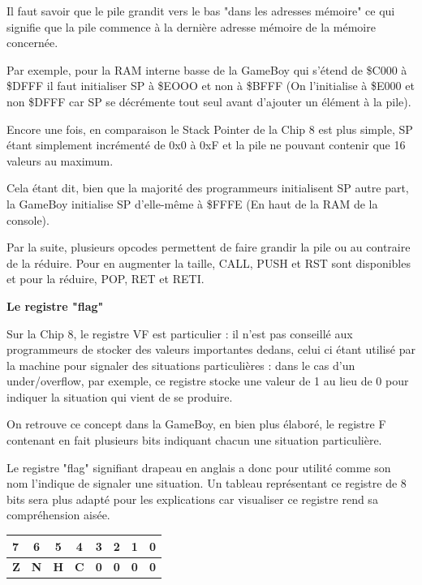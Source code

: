\documentclass[12pt, a4paper]{article}
\begin{document}
Il faut savoir que le pile grandit vers le bas "dans les adresses mémoire" ce qui signifie que la pile commence à la dernière adresse mémoire de la mémoire concernée. 

\bigskip

Par exemple, pour la RAM interne basse de la GameBoy qui s'étend de \$C000 à \$DFFF il faut initialiser SP à \$EOOO et non à \$BFFF (On l'initialise à \$E000 et non \$DFFF car SP se décrémente tout seul avant d'ajouter un élément à la pile). 

Encore une fois, en comparaison le Stack Pointer de la Chip 8 est plus simple, SP étant simplement incrémenté de 0x0 à 0xF et la pile ne pouvant contenir que 16 valeurs au maximum.

\pagebreak
Cela étant dit, bien que la majorité des programmeurs initialisent SP autre part, la GameBoy initialise SP d'elle-même à \$FFFE (En haut de la RAM de la console).

\bigskip

Par la suite, plusieurs opcodes permettent de faire grandir la pile ou au contraire de la réduire. Pour en augmenter la taille, CALL, PUSH et RST sont disponibles et pour la réduire, POP, RET et RETI.

\bigskip


\begin{center}{\bf Le registre "flag"}\end{center}

Sur la Chip 8, le registre VF est particulier : il n'est pas conseillé aux programmeurs de stocker des valeurs importantes dedans, celui ci étant utilisé par la machine pour signaler des situations particulières : dans le cas d'un under/overflow, par exemple, ce registre stocke une valeur de 1 au lieu de 0 pour indiquer la situation qui vient de se produire.

\bigskip
On retrouve ce concept dans la GameBoy, en bien plus élaboré, le registre F contenant en fait plusieurs bits indiquant chacun une situation particulière.

Le registre "flag" signifiant drapeau en anglais a donc pour utilité comme son nom l'indique de signaler une situation. Un tableau représentant ce registre de 8 bits sera plus adapté pour les explications car visualiser ce registre rend sa compréhension aisée.
\pagebreak
\bigskip
\bigskip
\bigskip
\begin{center}
\begin{tabular}{|l|c|c|c|c|c|c|c|}
\hline
7 & 6 & 5 & 4 & 3 & 2 & 1 & 0 \\
\hline
\bf Z & \bf N & \bf H & \bf C & \bf 0 &  \bf 0 & \bf 0 & \bf 0 \\
\hline
\end{tabular}
\end{center}
\bigskip
\end{document}
